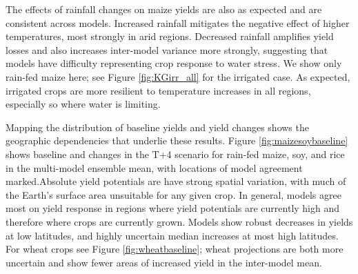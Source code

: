 \documentclass[preprint, 5p, times, twocolumn]{elsarticle}
\begin{document}
{The effects of rainfall changes on maize yields are also as expected and are consistent across models. Increased rainfall mitigates the negative effect of higher temperatures, most strongly in arid regions. Decreased rainfall amplifies yield losses and also increases inter-model variance more strongly, suggesting that models have difficulty representing crop response to water stress.  We show only rain-fed maize here; see Figure \ref{fig:KGirr_all} for the irrigated case. As expected, irrigated crops are more resilient to temperature increases in all regions, especially so where water is limiting.  

Mapping the distribution of baseline yields and yield changes shows the geographic dependencies that underlie these results. Figure \ref{fig:maizesoybaseline} shows baseline and changes in the T+4 scenario for rain-fed maize, soy, and rice in the multi-model ensemble mean, with locations of model agreement marked.Absolute yield potentials are have strong spatial variation, with much of the Earth's surface area unsuitable for any given crop. In general, models agree most on yield response in regions where yield potentials are currently high and therefore where crops are currently grown. Models show robust decreases in yields at low latitudes, and highly uncertain median increases at most high latitudes. For wheat crops see Figure \ref{fig:wheatbaseline}; wheat projections are both more uncertain and show fewer areas of increased yield in the inter-model mean. 

}
\end{document}
